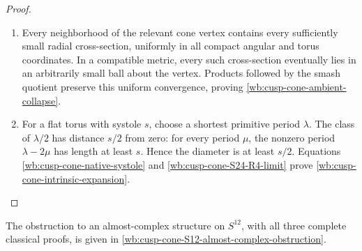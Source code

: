 \begin{proof}
\begin{enumerate}[label=\arabic*.,leftmargin=*]
\item Every neighborhood of the relevant cone vertex contains every sufficiently
small radial cross-section, uniformly in all compact angular and torus
coordinates.  In a compatible metric, every such cross-section eventually
lies in an arbitrarily small ball about the vertex.  Products followed by
the smash quotient preserve this uniform convergence, proving
\cref{wb:cusp-cone-ambient-collapse}.

\item For a flat torus with systole \(s\), choose a shortest primitive period
\(\lambda\).  The class of \(\lambda/2\) has distance \(s/2\) from zero:
for every period \(\mu\), the nonzero period \(\lambda-2\mu\) has length at
least \(s\).  Hence the diameter is at least \(s/2\).
Equations \cref{wb:cusp-cone-native-systole} and \cref{wb:cusp-cone-S24-R4-limit} prove
\cref{wb:cusp-cone-intrinsic-expansion}.
\end{enumerate}
\end{proof}

The obstruction to an almost-complex structure on \(S^{12}\),
with all three complete classical proofs, is given in
\cref{wb:cusp-cone-S12-almost-complex-obstruction}.


